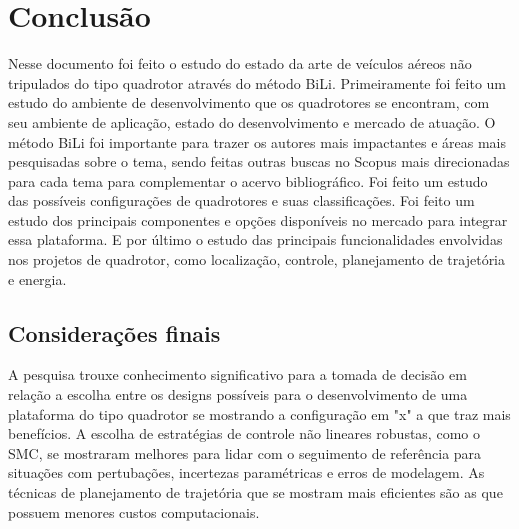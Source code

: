 \chapter{Conclusão}
\label{chap:conc}

Nesse documento foi feito o estudo do estado da arte de veículos aéreos não tripulados do tipo quadrotor através do método BiLi. Primeiramente foi feito um estudo do ambiente de desenvolvimento que os quadrotores se encontram, com seu ambiente de aplicação, estado do desenvolvimento e mercado de atuação. O método BiLi foi importante para trazer os autores mais impactantes e áreas mais pesquisadas sobre o tema, sendo feitas outras buscas no Scopus mais direcionadas para cada tema para complementar o acervo bibliográfico. Foi feito um estudo das possíveis configurações de quadrotores e suas classificações. Foi feito um estudo dos principais componentes e opções disponíveis no mercado para integrar essa plataforma. E por último o estudo das principais funcionalidades envolvidas nos projetos de quadrotor, como localização, controle, planejamento de trajetória e energia. 


\section{Considerações finais}
\label{sec:consid}

A pesquisa trouxe conhecimento significativo para a tomada de decisão em relação a escolha entre os designs possíveis para o desenvolvimento de uma plataforma do tipo quadrotor se mostrando a configuração em "x" a que traz mais benefícios. A escolha de estratégias de controle não lineares robustas, como o SMC, se mostraram melhores para lidar com o seguimento de referência para situações com pertubações, incertezas paramétricas e erros de modelagem. As técnicas de planejamento de trajetória que se mostram mais eficientes são as que possuem menores custos computacionais.


